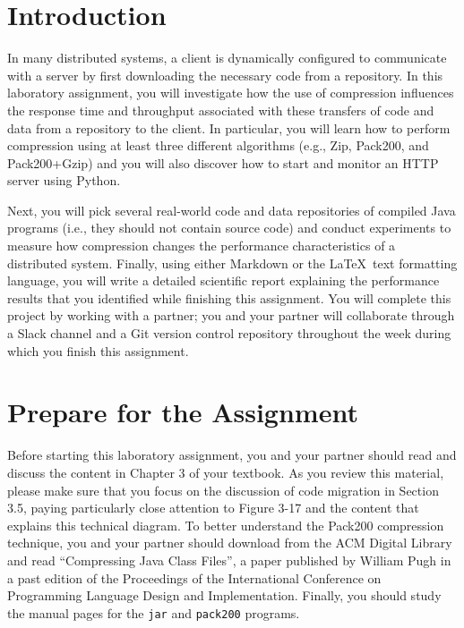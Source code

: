 


\usepackage[compact]{titlesec}



\section*{Introduction}

In many distributed systems, a client is dynamically configured to communicate with a server by first downloading the
necessary code from a repository. In this laboratory assignment, you will investigate how the use of compression
influences the response time and throughput associated with these transfers of code and data from a repository to the
client. In particular, you will learn how to perform compression using at least three different algorithms (e.g., Zip,
Pack200, and Pack200+Gzip) and you will also discover how to start and monitor an HTTP server using Python.

Next, you will pick several real-world code and data repositories of compiled Java programs (i.e., they should not
contain source code) and conduct experiments to measure how compression changes the performance characteristics of a
distributed system.  Finally, using either Markdown or the \LaTeX~text formatting language, you will write a detailed
scientific report explaining the performance results that you identified while finishing this assignment. You will
complete this project by working with a partner; you and your partner will collaborate through a Slack channel and a Git
version control repository throughout the week during which you finish this assignment.

\section*{Prepare for the Assignment}

Before starting this laboratory assignment, you and your partner should read and discuss the content in Chapter 3
of your textbook. As you review this material, please make sure that you focus on the discussion of code migration in
Section 3.5, paying particularly close attention to Figure 3-17 and the content that explains this technical diagram.
To better understand the Pack200 compression technique, you and your partner should download from the ACM Digital
Library and read ``Compressing Java Class Files'', a paper published by William Pugh in a past edition of the
Proceedings of the International Conference on Programming Language Design and Implementation. Finally, you should study
the manual pages for the {\tt jar} and {\tt pack200} programs.

